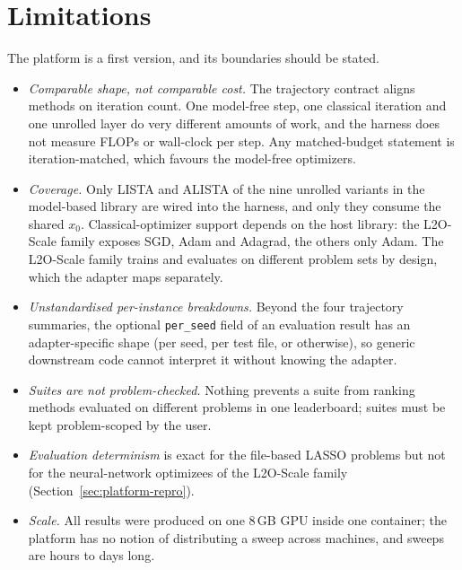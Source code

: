 \section{Limitations}
\label{sec:platform-limitations}

The platform is a first version, and its boundaries should be stated.
\begin{itemize}
  \item \emph{Comparable shape, not comparable cost.} The trajectory contract
    aligns methods on iteration count. One model-free step, one classical
    iteration and one unrolled layer do very different amounts of work, and
    the harness does not measure FLOPs or wall-clock per step. Any
    matched-budget statement is iteration-matched, which favours the
    model-free optimizers.
  \item \emph{Coverage.} Only LISTA and ALISTA of the nine unrolled variants
    in the model-based library are wired into the harness, and only they
    consume the shared $x_0$. Classical-optimizer support depends on the host
    library: the L2O-Scale family exposes SGD, Adam and Adagrad, the others
    only Adam. The L2O-Scale family trains and evaluates on different problem
    sets by design, which the adapter maps separately.
  \item \emph{Unstandardised per-instance breakdowns.} Beyond the four
    trajectory summaries, the optional \texttt{per\_seed} field of an
    evaluation result has an adapter-specific shape (per seed, per test file,
    or otherwise), so generic downstream code cannot interpret it without
    knowing the adapter.
  \item \emph{Suites are not problem-checked.} Nothing prevents a suite from
    ranking methods evaluated on different problems in one leaderboard; suites
    must be kept problem-scoped by the user.
  \item \emph{Evaluation determinism} is exact for the file-based LASSO
    problems but not for the neural-network optimizees of the L2O-Scale
    family (Section~\ref{sec:platform-repro}).
  \item \emph{Scale.} All results were produced on one 8\,GB GPU inside one
    container; the platform has no notion of distributing a sweep across
    machines, and sweeps are hours to days long.
\end{itemize}
